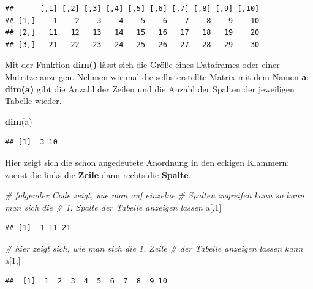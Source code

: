 \documentclass[]{book}
\newenvironment{Shaded}{\begin{snugshade}}{\end{snugshade}}
\newcommand{\KeywordTok}[1]{\textcolor[rgb]{0.13,0.29,0.53}{\textbf{#1}}}
\newcommand{\DecValTok}[1]{\textcolor[rgb]{0.00,0.00,0.81}{#1}}
\newcommand{\CommentTok}[1]{\textcolor[rgb]{0.56,0.35,0.01}{\textit{#1}}}
\newcommand{\NormalTok}[1]{#1}
\begin{document}
\begin{verbatim}
##      [,1] [,2] [,3] [,4] [,5] [,6] [,7] [,8] [,9] [,10]
## [1,]    1    2    3    4    5    6    7    8    9    10
## [2,]   11   12   13   14   15   16   17   18   19    20
## [3,]   21   22   23   24   25   26   27   28   29    30
\end{verbatim}

Mit der Funktion \textbf{dim()} lässt sich die Größe eines Dataframes
oder einer Matritze anzeigen. Nehmen wir mal die selbsterstellte Matrix
mit dem Namen \textbf{a}: \textbf{dim(a)} gibt die Anzahl der Zeilen und
die Anzahl der Spalten der jeweiligen Tabelle wieder.

\begin{Shaded}
\begin{Highlighting}[]
\KeywordTok{dim}\NormalTok{(a)}
\end{Highlighting}
\end{Shaded}

\begin{verbatim}
## [1]  3 10
\end{verbatim}

Hier zeigt sich die schon angedeutete Anordnung in den eckigen Klammern:
zuerst die links die \textbf{Zeile} dann rechts die \textbf{Spalte}.

\begin{Shaded}
\begin{Highlighting}[]
\CommentTok{# folgender Code zeigt, wie man auf einzelne }
\CommentTok{# Spalten zugreifen kann so kann man sich die }
\CommentTok{# 1. Spalte der Tabelle anzeigen lassen}
\NormalTok{a[,}\DecValTok{1}\NormalTok{]}
\end{Highlighting}
\end{Shaded}

\begin{verbatim}
## [1]  1 11 21
\end{verbatim}

\begin{Shaded}
\begin{Highlighting}[]
\CommentTok{# hier zeigt sich, wie man sich die 1. Zeile }
\CommentTok{# der Tabelle anzeigen lassen kann}
\NormalTok{a[}\DecValTok{1}\NormalTok{,]}
\end{Highlighting}
\end{Shaded}

\begin{verbatim}
##  [1]  1  2  3  4  5  6  7  8  9 10
\end{verbatim}
\end{document}
